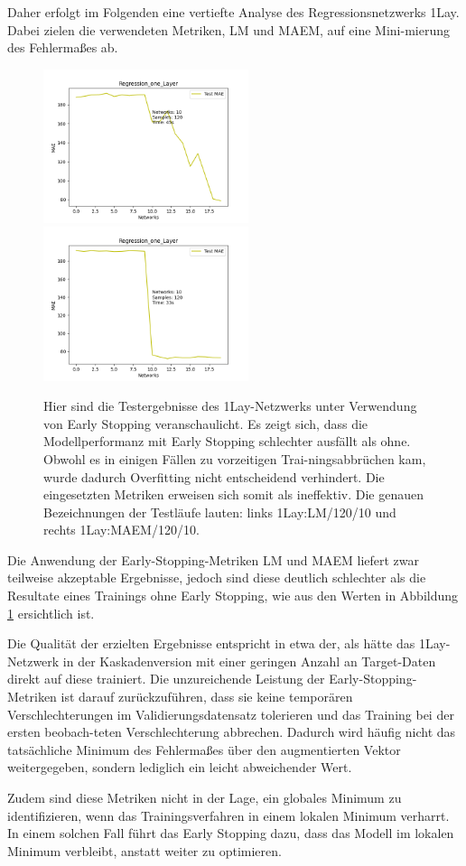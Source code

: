 Daher erfolgt im Folgenden eine vertiefte Analyse des Regressionsnetzwerks 1Lay. Dabei zielen die verwendeten Metriken, LM und MAEM, auf eine 
Mini-mierung des Fehlermaßes ab.

\begin{figure}[htpb]
    \includegraphics[height=4.5cm]{../../Plots/ba_plots/earlystopping/lossmetric/onelayer_ts.png}
    \includegraphics[height=4.5cm]{../../Plots/ba_plots/earlystopping/intermetric/onelayer_ts.png}
    \caption{\label{fig:onelayermetrics} 
    \small{Hier sind die Testergebnisse des 1Lay-Netzwerks unter Verwendung von Early Stopping veranschaulicht. Es zeigt sich, 
    dass die Modellperformanz mit Early Stopping schlechter ausfällt als ohne. 
    Obwohl es in einigen Fällen zu vorzeitigen Trai-ningsabbrüchen kam, wurde dadurch Overfitting nicht entscheidend verhindert. 
    Die eingesetzten Metriken erweisen sich somit als ineffektiv. 
    Die genauen Bezeichnungen der Testläufe lauten: links 1Lay:LM/120/10 und rechts 1Lay:MAEM/120/10.}}
\end{figure}

Die Anwendung der Early-Stopping-Metriken LM und MAEM liefert zwar teilweise akzeptable Ergebnisse, jedoch sind diese deutlich schlechter als die 
Resultate eines Trainings ohne Early Stopping, wie aus den Werten in Abbildung \ref{fig:onelayermetrics} ersichtlich ist.

Die Qualität der erzielten Ergebnisse entspricht in etwa der, als hätte das 1Lay-Netzwerk in der Kaskadenversion mit einer geringen Anzahl an 
Target-Daten direkt auf diese trainiert. Die unzureichende Leistung der Early-Stopping-Metriken ist darauf zurückzuführen, dass sie keine temporären 
Verschlechterungen im Validierungsdatensatz tolerieren und das Training bei der ersten beobach-teten Verschlechterung abbrechen. Dadurch wird 
häufig nicht das tatsächliche Minimum des Fehlermaßes über den augmentierten Vektor weitergegeben, sondern lediglich ein leicht abweichender 
Wert.

Zudem sind diese Metriken nicht in der Lage, ein globales Minimum zu identifizieren, wenn das Trainingsverfahren in einem lokalen Minimum 
verharrt. In einem solchen Fall führt das Early Stopping dazu, dass das Modell im lokalen Minimum verbleibt, anstatt weiter zu 
optimieren.
